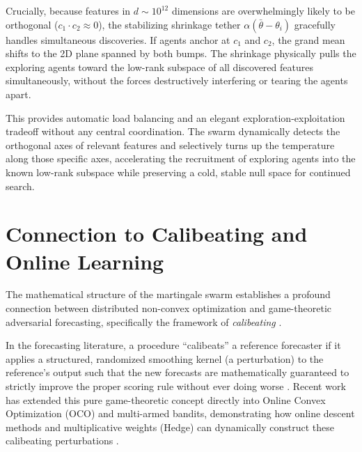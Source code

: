 \documentclass{article}
\begin{document}
Crucially, because features in $d \sim 10^{12}$ dimensions are overwhelmingly likely to be orthogonal ($c_1 \cdot c_2 \approx 0$), the stabilizing shrinkage tether $\alpha(\bar{\theta} - \theta_i)$ gracefully handles simultaneous discoveries. If agents anchor at $c_1$ and $c_2$, the grand mean shifts to the 2D plane spanned by both bumps. The shrinkage physically pulls the exploring agents toward the low-rank subspace of all discovered features simultaneously, without the forces destructively interfering or tearing the agents apart.

This provides automatic load balancing and an elegant exploration-exploitation tradeoff without any central coordination. The swarm dynamically detects the orthogonal axes of relevant features and selectively turns up the temperature along those specific axes, accelerating the recruitment of exploring agents into the known low-rank subspace while preserving a cold, stable null space for continued search.

\section{Connection to Calibeating and Online Learning}

The mathematical structure of the martingale swarm establishes a profound connection between distributed non-convex optimization and game-theoretic adversarial forecasting, specifically the framework of \emph{calibeating} \cite{foster2023calibeating}.

In the forecasting literature, a procedure ``calibeats'' a reference forecaster if it applies a structured, randomized smoothing kernel (a perturbation) to the reference's output such that the new forecasts are mathematically guaranteed to strictly improve the proper scoring rule without ever doing worse \cite{foster2023calibeating, hart2021calibrated}. Recent work has extended this pure game-theoretic concept directly into Online Convex Optimization (OCO) and multi-armed bandits, demonstrating how online descent methods and multiplicative weights (Hedge) can dynamically construct these calibeating perturbations \cite{lee2022online, chen2026calibeating}.
\end{document}
